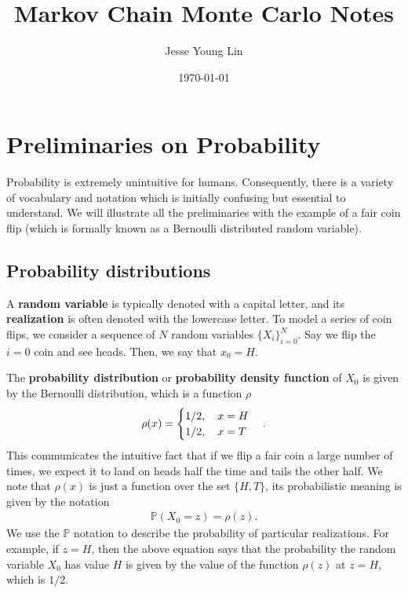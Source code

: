 \documentclass[11pt]{article}
\author{Jesse Young Lin}
\date{\today}
\title{Markov Chain Monte Carlo Notes}
\begin{document}
\maketitle
\tableofcontents

\section{Preliminaries on Probability}
\label{sec:org22a565b}
Probability is extremely unintuitive for humans. Consequently,
there is a variety of vocabulary and notation which is initially confusing but
essential to understand. We will illustrate all the preliminaries with the
example of a fair coin flip (which is formally known as a Bernoulli distributed
random variable).
\subsection{Probability distributions}
\label{sec:org6627e45}
A \textbf{random variable} is typically denoted with a capital letter, and its
\textbf{realization} is often denoted with the lowercase letter. To model a series of
coin flips, we consider a sequence of \(N\) random variables
\(\{X_{i}\}_{i=0}^{N}\). Say we flip the \(i=0\) coin and see heads. Then, we
say that \(x_{0} = H\).

The \textbf{probability distribution} or \textbf{probability density function} of \(X_{0}\) is
given by the Bernoulli distribution, which is a function \(\rho\)
\begin{align*}
\rho(x) = \begin{cases}
1/2\qc{x = H} \\
1/2\qc{x = T}
\end{cases}.
\end{align*}
This communicates the intuitive fact that if we flip a fair coin a large number
of times, we expect it to land on heads half the time and tails the other half.
We note that \(\rho(x)\) is just a function over the set \(\{H,T\}\), its
probabilistic meaning is given by the notation
\begin{align*}
\mathbb{P}(X_{0} = z) = \rho(z).
\end{align*}
We use the \(\mathbb{P}\) notation to describe the probability of particular
realizations. For example, if \(z = H\), then the above equation says that the
probability the random variable \(X_{0}\) has value \(H\) is given by the value
of the function \(\rho(z)\) at \(z = H\), which is \(1/2\).
\end{document}
